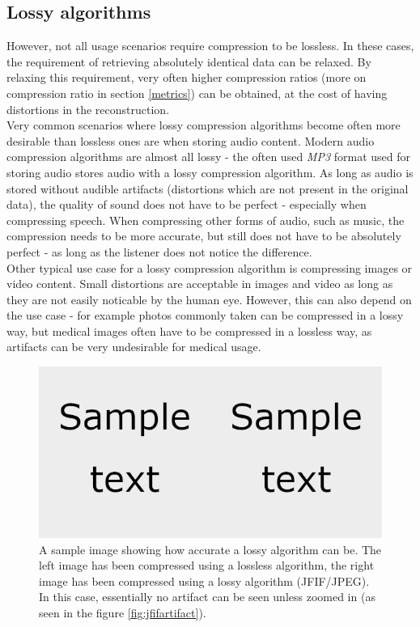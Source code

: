 \documentclass[thesis=M,english]{FITthesis}[2012/10/20]
\begin{document}
\subsection{Lossy algorithms}
However, not all usage scenarios require compression to be lossless. In
these cases, the requirement of retrieving absolutely identical data can
be relaxed. By relaxing this requirement, very often higher compression
ratios (more on compression ratio in section \ref{metrics}) can be obtained,
at the cost of having distortions in the reconstruction.
\\

Very common scenarios where lossy compression algorithms become often more
desirable than lossless ones are when storing audio content. Modern audio
compression algorithms are almost all lossy - the often used \emph{MP3}
format used for storing audio stores audio with a lossy compression
algorithm. As long as audio is stored without audible artifacts (distortions
which are not present in the original data), the quality of sound does not
have to be perfect - especially when compressing speech. When compressing
other forms of audio, such as music, the compression needs to be more accurate,
but still does not have to be absolutely perfect - as long as the listener
does not notice the difference.
\\

Other typical use case for a lossy compression algorithm is compressing images
or video content. Small distortions are acceptable in images and video as long
as they are not easily noticable by the human eye. However, this can also depend
on the use case - for example photos commonly taken can be compressed in a lossy
way, but medical images often have to be compressed in a lossless way, as artifacts
can be very undesirable for medical usage.

\begin{figure}[h]
  \centering
  \includegraphics{imgs/sampletext-comparison}
  \caption{A sample image showing how accurate a lossy algorithm can be. The left image
           has been compressed using a lossless algorithm, the right image has been
           compressed using a lossy algorithm (JFIF/JPEG). In this case, essentially
           no artifact can be seen unless zoomed in (as seen in the figure \ref{fig:jfifartifact}).}
  \label{fig:jfifvspng-sample}
\end{figure}
\end{document}
